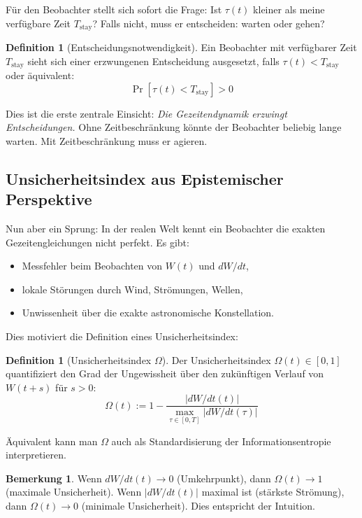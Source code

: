 \documentclass[a4paper, 12pt, twoside, openright]{report}
\theoremstyle{definition}
\newtheorem{definition}[theorem]{Definition}
\theoremstyle{definition}
\newtheorem{bemerkung}{Bemerkung}[chapter]
\begin{document}
Für den Beobachter stellt sich sofort die Frage: Ist $\tau(t)$ kleiner als meine verfügbare Zeit $T_{\text{stay}}$? Falls nicht, muss er entscheiden: warten oder gehen?

\begin{definition}[Entscheidungsnotwendigkeit]
    Ein Beobachter mit verfügbarer Zeit $T_{\text{stay}}$ sieht sich einer erzwungenen Entscheidung ausgesetzt, falls $\tau(t) < T_{\text{stay}}$ oder äquivalent:
    \begin{equation}
        \Pr[\tau(t) < T_{\text{stay}}] > 0
    \end{equation}
\end{definition}

Dies ist die erste zentrale Einsicht: \emph{Die Gezeitendynamik erzwingt Entscheidungen.} Ohne Zeitbeschränkung könnte der Beobachter beliebig lange warten. Mit Zeitbeschränkung muss er agieren.

\subsection{Unsicherheitsindex aus Epistemischer Perspektive}

Nun aber ein Sprung: In der realen Welt kennt ein Beobachter die exakten Gezeitengleichungen nicht perfekt. Es gibt:
\begin{itemize}
    \item Messfehler beim Beobachten von $W(t)$ und $dW/dt$,
    \item lokale Störungen durch Wind, Strömungen, Wellen,
    \item Unwissenheit über die exakte astronomische Konstellation.
\end{itemize}

Dies motiviert die Definition eines Unsicherheitsindex:

\begin{definition}[Unsicherheitsindex $\Omega$]
    Der Unsicherheitsindex $\Omega(t) \in [0,1]$ quantifiziert den Grad der Ungewissheit über den zukünftigen Verlauf von $W(t+s)$ für $s > 0$:
    \begin{equation}
        \Omega(t) := 1 - \frac{|dW/dt(t)|}{\max_{\tau \in [0,T]} |dW/dt(\tau)|}
    \end{equation}
    
    Äquivalent kann man $\Omega$ auch als Standardisierung der Informationsentropie interpretieren.
\end{definition}

\begin{bemerkung}
    Wenn $dW/dt(t) \to 0$ (Umkehrpunkt), dann $\Omega(t) \to 1$ (maximale Unsicherheit). Wenn $|dW/dt(t)|$ maximal ist (stärkste Strömung), dann $\Omega(t) \to 0$ (minimale Unsicherheit). Dies entspricht der Intuition.
\end{bemerkung}
\end{document}
